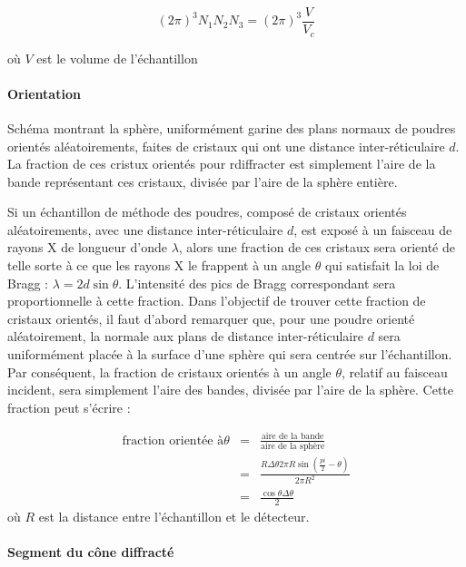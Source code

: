 \begin{equation}
    (2\pi)^3 N_1N_2N_3 = (2\pi)^3 \frac{V}{V_c}
    \label{eq:integration}
\end{equation}

où $V$ est le volume de l'échantillon

\paragraph{Orientation}

\begin{marginfigure}
    \TODO
    \caption{Schéma montrant la sphère, uniformément garine des plans normaux de poudres orientés aléatoirements, faites de cristaux qui ont une distance inter-réticulaire $d$. La fraction de ces cristux orientés pour rdiffracter est simplement l'aire de la bande représentant ces cristaux, divisée par l'aire de la sphère entière.}
    \label{fig:}
\end{marginfigure}

Si un échantillon de méthode des poudres, composé de cristaux orientés aléatoirements, avec une distance inter-réticulaire $d$, est exposé à un faisceau de rayons X de longueur d'onde $\lambda$, alors une fraction de ces cristaux sera orienté de telle sorte à ce que les rayons X le frappent à un angle $\theta$ qui satisfait la loi de Bragg : $\lambda = 2d \sin \theta$. L'intensité des pics de Bragg correspondant sera proportionnelle à cette fraction. Dans l'objectif de trouver cette fraction de cristaux orientés, il faut d'abord remarquer que, pour une poudre orienté aléatoirement, la normale aux plans de distance inter-réticulaire $d$ sera uniformément placée à la surface d'une sphère qui sera centrée sur l'échantillon. Par conséquent, la fraction de cristaux orientés à un angle $\theta$, relatif au faisceau incident, sera simplement l'aire des bandes, divisée par l'aire de la sphère. Cette fraction peut s'écrire :

\begin{eqnarray}
    \text{fraction orientée à} \theta & = & \frac{\text{aire de la bande}}{\text{aire de la sphère}} \\
    & = & \frac{R\Delta \theta 2 \pi R \sin \left(\frac{pi}{2} - \theta \right)}{2\pi R^2}\\
    & = & \frac{\cos\theta \Delta \theta}{2}
    \label{eq:orientation}
\end{eqnarray}
où $R$ est la distance entre l'échantillon et le détecteur.

\paragraph{Segment du cône diffracté}

